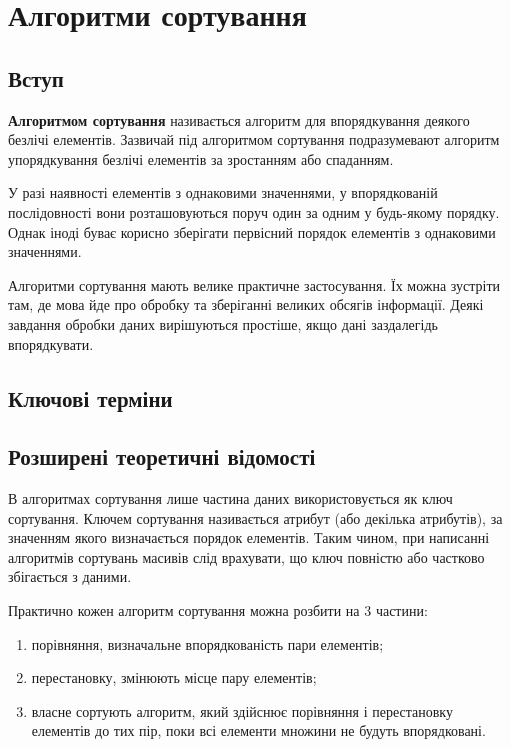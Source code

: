 \chapter{Алгоритми сортування}


\nopagebreak[4]
\section{Вступ}
\nopagebreak[4]
\textbf{Алгоритмом сортування} називається алгоритм для впорядкування деякого безлічі елементів. Зазвичай під алгоритмом сортування подразумевают алгоритм упорядкування безлічі елементів за зростанням або спаданням.

У разі наявності елементів з однаковими значеннями, у впорядкованій послідовності вони розташовуються поруч один за одним у будь-якому порядку. Однак іноді буває корисно зберігати первісний порядок елементів з однаковими значеннями.

Алгоритми сортування мають велике практичне застосування. Їх можна зустріти там, де мова йде про обробку та зберіганні великих обсягів інформації. Деякі завдання обробки даних вирішуються простіше, якщо дані заздалегідь впорядкувати.

\section{Ключові терміни}
\nopagebreak[4]




\section{Розширені теоретичні відомості}
\nopagebreak[4]
В алгоритмах сортування лише частина даних використовується як ключ сортування. Ключем сортування називається атрибут (або декілька атрибутів), за значенням якого визначається порядок елементів. Таким чином, при написанні алгоритмів сортувань масивів слід врахувати, що ключ повністю або частково збігається з даними.

Практично кожен алгоритм сортування можна розбити на 3 частини:
\begin{enumerate}
\item порівняння, визначальне впорядкованість пари елементів;
\item перестановку, змінюють місце пару елементів;
\item власне сортують алгоритм, який здійснює порівняння і перестановку елементів до тих пір, поки всі елементи множини не будуть впорядковані.
\end{enumerate}

